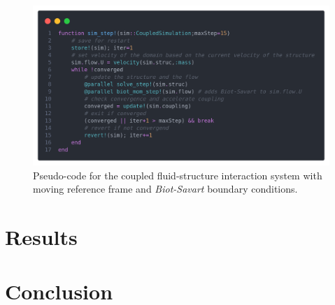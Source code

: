 \documentclass{jfm}
\begin{document}
\begin{figure}
    \centering
    \includegraphics[width=\textwidth]{figures/code.png}
    \caption{Pseudo-code for the coupled fluid-structure interaction system with moving reference frame and \emph{Biot-Savart} boundary conditions.}
    \label{fig:fsi-biot-MRF}
\end{figure}

\section{Results}

\section{Conclusion}



\end{document}
